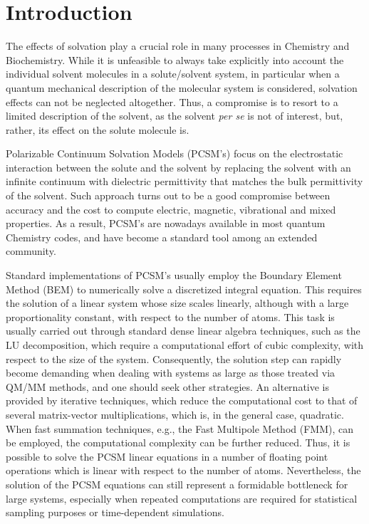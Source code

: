 \section{Introduction}\label{sec:intro}

The effects of solvation play a crucial role in many processes in Chemistry and Biochemistry. While it is unfeasible to always take explicitly into account the individual solvent molecules in a solute/solvent system, in particular when a quantum mechanical description of the molecular system is considered, solvation effects can not be neglected altogether. Thus, a compromise is to resort to a limited description of the solvent, as the solvent {\it per se} is not of interest, but, rather, its effect on the solute molecule is.

Polarizable Continuum Solvation Models (PCSM's)\cite{ReviewPCM_2005,Cramer:1999wt,Orozco_CR_Solvent00,Klamt:2011we,Mennucci:2012ct,honig1995cla,Roux:1999vp,Klamt_JCS_Cosmo,Chipman_JCP_SSVPE,Chipman_JCP_SSVPE2,Mennucci_JCP_IEF1,Mennucci_JMC_IEF2,Mennucci_JPCB_IEF3, Barone_JCPA_CPCM,Cossi_JCC_CPCM, Lipparini_JCP_VPCM,Lipparini_JCTC_VPCMSCF,Truhlar_JPCB_SMD}  focus on the electrostatic interaction between the solute and the solvent by replacing the solvent with an infinite continuum with dielectric permittivity that matches the bulk permittivity of the solvent.
Such approach turns out to be a good compromise between accuracy and the cost to compute electric, magnetic, vibrational and mixed properties\cite{Mennucci_JPCL_PCM,Mennucci:2012ct,ReviewPCM_2005}. As a result, PCSM's are nowadays available in most quantum Chemistry codes, and have become a standard tool among an extended community. 

Standard implementations of PCSM's usually employ the Boundary Element Method\cite{MST,ReviewPCM_1994,ReviewPCM_2005,Scalmani_JCP_CSC,York_JPCA_CSC,
Herbert_JCP_ISWIG} (BEM) to numerically solve a discretized integral equation. This requires the solution of a linear system whose size scales linearly, although with a large proportionality constant, with respect to the number of atoms. This task is usually carried out through standard dense linear algebra techniques, such as the LU decomposition\cite{Cammi_JCC_Inversion}, which require a computational effort of cubic complexity, with respect to the size of the system. Consequently, the solution step can rapidly become demanding when dealing with systems as large as those treated via QM/MM methods, and one should seek other strategies. An alternative is provided by iterative techniques, which reduce the computational cost to that of several matrix-vector multiplications\cite{Scalmani_TCA_Iterative}, which is, in  the general case, quadratic. When fast summation techniques, e.g., the Fast Multipole Method (FMM)\cite{FMM}, can be employed, the computational complexity can be further reduced. Thus, it is possible to solve the PCSM linear equations in a number of floating point operations which is linear with respect to the number of atoms. Nevertheless, the solution of the PCSM equations can still represent a formidable bottleneck for large systems\cite{Lipparini_JPCL_ddCOSMO}, especially when repeated computations are required for statistical sampling purposes or time-dependent simulations.

